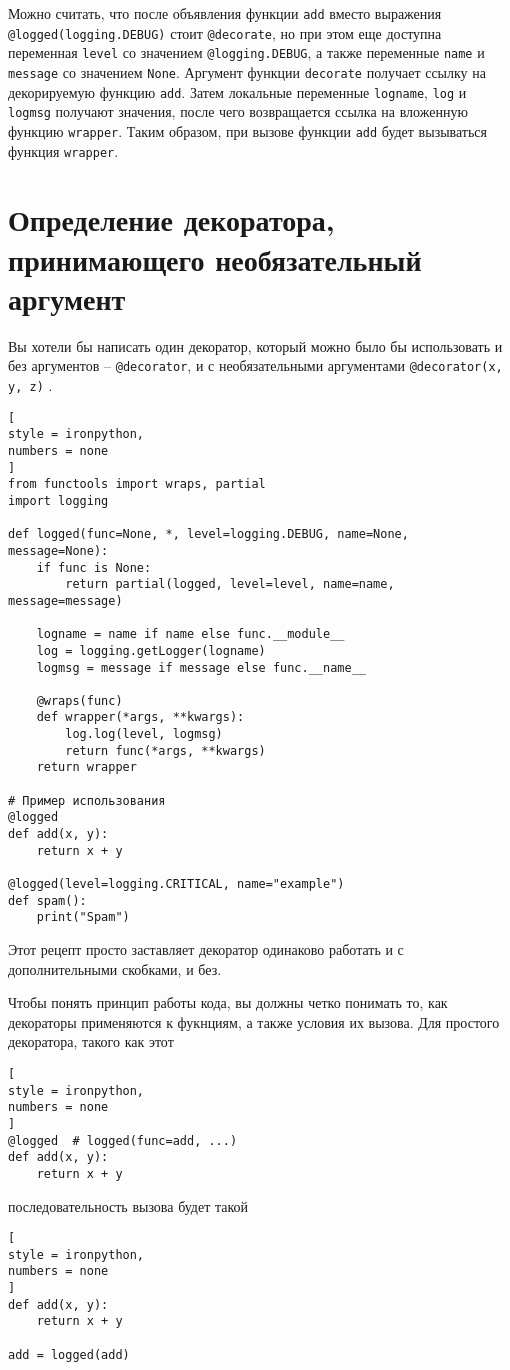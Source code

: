 \documentclass[%
	11pt,
	a4paper,
	utf8,
		]{article}
\begin{document}
Можно считать, что после объявления функции \texttt{add} вместо выражения \verb|@logged(logging.DEBUG)| стоит \verb|@decorate|, но при этом еще доступна переменная \verb|level| со значением \verb|@logging.DEBUG|, а также переменные \texttt{name} и \texttt{message} со значением \texttt{None}. Аргумент функции \texttt{decorate} получает ссылку на декорируемую функцию \texttt{add}. Затем локальные переменные \texttt{logname}, \texttt{log} и \texttt{logmsg} получают значения, после чего возвращается ссылка на вложенную функцию \texttt{wrapper}. Таким образом, при вызове функции \texttt{add} будет вызываться функция \texttt{wrapper}.

\section{Определение декоратора, принимающего необязательный аргумент}

Вы хотели бы написать один декоратор, который можно было бы использовать и без аргументов -- \verb|@decorator|, и с необязательными аргументами \verb|@decorator(x, y, z)| \cite[]{beazley:python_cookbook-2019}.

\begin{lstlisting}[
style = ironpython,
numbers = none
]
from functools import wraps, partial
import logging

def logged(func=None, *, level=logging.DEBUG, name=None, message=None):
    if func is None:
        return partial(logged, level=level, name=name, message=message)
        
    logname = name if name else func.__module__
    log = logging.getLogger(logname)
    logmsg = message if message else func.__name__
    
    @wraps(func)
    def wrapper(*args, **kwargs):
        log.log(level, logmsg)
        return func(*args, **kwargs)
    return wrapper
    
# Пример использования
@logged
def add(x, y):
    return x + y
    
@logged(level=logging.CRITICAL, name="example")
def spam():
    print("Spam")
\end{lstlisting}

Этот рецепт просто заставляет декоратор одинаково работать и с дополнительными скобками, и без.

Чтобы понять принцип работы кода, вы должны четко понимать то, как декораторы применяются к фукнциям, а также условия их вызова. Для простого декоратора, такого как этот
\begin{lstlisting}[
style = ironpython,
numbers = none
]
@logged  # logged(func=add, ...)
def add(x, y):
    return x + y
\end{lstlisting}
последовательность вызова будет такой
\begin{lstlisting}[
style = ironpython,
numbers = none
]
def add(x, y):
    return x + y
    
add = logged(add)
\end{lstlisting}
\end{document}
